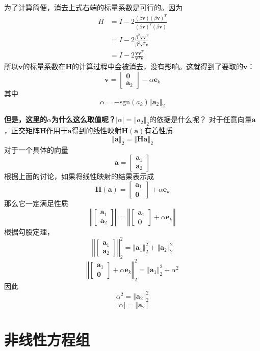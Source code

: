 \documentclass[14pt, letterpaper, UTF8, fontset=windowsnew, heading=true]{article}
\providecommand{\abs}[1]{\left\vert#1\right\vert}
\providecommand{\norm}[1]{\left\Vert#1\right\Vert}
\begin{document}
为了计算简便，消去上式右端的标量系数是可行的。因为
$$ \begin{aligned} H &=I-2 \frac{(\beta \bm{v})( \beta \bm{v})^T} {( \beta \bm{v})^T 
(\beta \bm{v})} \\ &=I-2\frac{\beta ^2 \bm{v} \bm{v}^T}{\beta ^2 \bm{v}^T 
\bm{v}} \\ &= I-2\frac{ \bm{v} \bm{v}^T}{ \bm{v}^T  \bm{v}} \end{aligned} $$
所以$\bm{v}$的标量系数在$\bm{H}$的计算过程中会被消去，没有影响。这就得到了要取的$\bm{v}$：
$$\bm{v}=\begin{bmatrix}\bm{0}\\ \bm{a}_2\end{bmatrix}-\alpha \bm{e}_k$$
其中
$$\alpha=-\text{sgn} (a_k)\norm{\bm{a}_2}_2$$
\par
\textbf{但是，这里的$\alpha$为什么这么取值呢？}$\abs{\alpha}=\norm{a_2}_2$的依据是什么呢？
对于任意向量$\bm{a}$，正交矩阵$\bm{H}$作用于$\bm{a}$得到的线性映射$\bm{H}(\bm{a})$有着性质
$$\norm{\bm{a}}_2=\norm{\bm{Ha}}_2$$
对于一个具体的向量
$$\bm{a}=\begin{bmatrix}\bm{a}_1\\ \bm{a}_2\end{bmatrix}$$
根据上面的讨论，如果将线性映射的结果表示成
$$\bm{H}(\bm{a})=\begin{bmatrix}\bm{a}_1\\ \bm{0}\end{bmatrix} + \alpha \bm{e}_k$$
那么它一定满足性质
$$\norm{\begin{bmatrix}\bm{a}_1\\ \bm{a}_2\end{bmatrix}}=\norm{\begin{bmatrix}\bm{a}_1\\ \bm{0}\end{bmatrix} + \alpha \bm{e}_k}$$
根据勾股定理，
$$\norm{\begin{bmatrix}\bm{a}_1\\ \bm{a}_2\end{bmatrix}}_2^2=\norm{\bm{a}_1}_2^2+\norm{\bm{a}_2}_2^2$$
$$\norm{\begin{bmatrix}\bm{a}_1\\ \bm{0}\end{bmatrix} + \alpha \bm{e}_k}_2^2=\norm{\bm{a}_1}_2^2 + \alpha^2$$
因此
$$\alpha^2=\norm{\bm{a}_2}_2^2$$
$$\abs{\alpha}=\norm{\bm{a}_2}$$

\section{非线性方程组}
\end{document}
